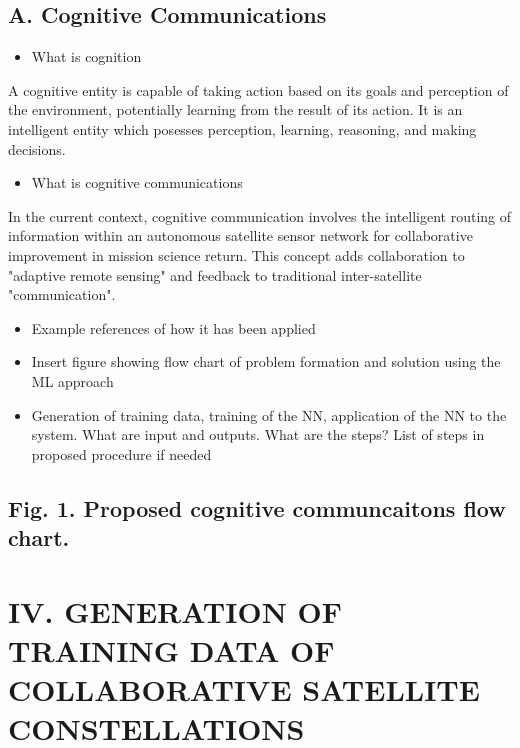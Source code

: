 \documentclass[11pt]{article}
\begin{document}
\subsection*{A. Cognitive Communications}
\label{sec:orgda10b42}

\begin{itemize}
\item What is cognition
\end{itemize}

A cognitive entity is capable of taking action based on its goals and perception
of the environment, potentially learning from the result of its action.  It is
an intelligent entity which posesses perception, learning, reasoning, and making
decisions.

\begin{itemize}
\item What is cognitive communications
\end{itemize}

In the current context, cognitive communication involves the intelligent
routing of information within an autonomous satellite sensor network for
collaborative improvement in mission science return.  This concept adds
collaboration to "adaptive remote sensing" and feedback to traditional
inter-satellite "communication".

\begin{itemize}
\item Example references of how it has been applied

\item Insert figure showing flow chart of problem formation and solution using the
ML approach

\item Generation of training data, training of the NN, application of the NN to the
system. What are input and outputs. What are the steps? List of steps in
proposed procedure if needed
\end{itemize}

\subsection*{Fig. 1. Proposed cognitive communcaitons flow chart.}
\label{sec:org90f0529}

\section*{IV. GENERATION OF TRAINING DATA OF COLLABORATIVE SATELLITE CONSTELLATIONS}
\label{sec:org6e9610b}
\end{document}
